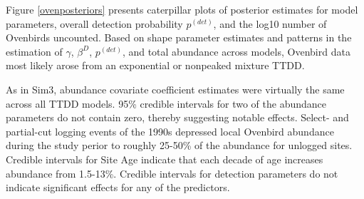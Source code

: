 \documentclass[useAMS,usenatbib,referee,12pt]{article}
\newcommand{\pdet}{p^{(det)}}
\begin{document}

Figure \ref{ovenposteriors} presents caterpillar plots of posterior estimates for model parameters, overall detection probability $\pdet$, and the log10 number of Ovenbirds uncounted.  
Based on shape parameter estimates and patterns in the estimation of $\gamma$, $\beta^D$, $\pdet$, and total abundance across models, Ovenbird data most likely arose from an exponential or nonpeaked mixture TTDD.

As in Sim3, abundance covariate coefficient estimates were virtually the same across all TTDD models.  
95\% credible intervals for two of the abundance parameters do not contain zero, thereby suggesting notable effects.  
Select- and partial-cut logging events of the 1990s depressed local Ovenbird abundance during the study perior to roughly 25-50\% of the abundance for unlogged sites.  
Credible intervals for Site Age indicate that each decade of age increases abundance from 1.5-13\%.
Credible intervals for detection parameters do not indicate significant effects for any of the predictors.
\end{document}
